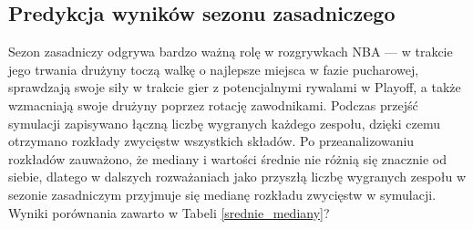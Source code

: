 \documentclass[inzynierska]{pwr_wmat_praca_dyplomowa}
\theoremstyle{plain}
\numberwithin{theorem}{chapter}
\theoremstyle{definition}
\numberwithin{theorem}{chapter}
\begin{document}
\subsection{Predykcja wyników sezonu zasadniczego} \label{predykcja_zasadniczego}
Sezon zasadniczy odgrywa bardzo ważną rolę w rozgrywkach NBA --- w trakcie jego trwania drużyny toczą walkę o najlepsze miejsca w fazie pucharowej, sprawdzają swoje siły w trakcie gier z potencjalnymi rywalami w Playoff, a także wzmacniają swoje drużyny poprzez rotację zawodnikami. Podczas przejść symulacji zapisywano łączną liczbę wygranych każdego zespołu, dzięki czemu otrzymano rozkłady zwycięstw wszystkich składów. Po przeanalizowaniu rozkładów zauważono, że mediany i wartości średnie nie różnią się znacznie od siebie, dlatego w dalszych rozważaniach jako przyszłą liczbę wygranych zespołu w sezonie zasadniczym przyjmuje się medianę rozkładu zwycięstw w symulacji. Wyniki porównania zawarto w Tabeli \ref{srednie_mediany}?
\end{document}
